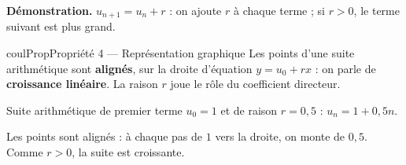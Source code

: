 \documentclass[11pt,a4paper]{article}
\makeatletter
\newcounter{lycee@signet}
\newcommand{\signet}[3][]{\stepcounter{lycee@signet}%
  \edef\lycee@dest{\if\relax\detokenize{#1}\relax
    signet.\arabic{lycee@signet}\else#1\fi}%
  \hypertarget{\lycee@dest}{}\bookmark[level=#2,dest=\lycee@dest]{#3}}
\newenvironment{proprietebox}[1][Propriété]%
  {\begin{boitecours}[phantom={\signet{2}{#1}}]{coulProp}{#1}}{\end{boitecours}}
\newcommand{\demo}[1]{\textbf{\color{coulMeth}Démonstration.} #1}
\makeatother
\begin{document}
\demo{$u_{n+1}=u_{n}+r$ : on ajoute $r$ à chaque terme ; si $r>0$, le terme suivant est
plus grand.}

\begin{proprietebox}[Propriété 4 --- Représentation graphique]
Les points d'une suite arithmétique sont \textbf{alignés}, sur la droite d'équation
$y=u_{0}+rx$ : on parle de \textbf{croissance linéaire}. La raison $r$ joue le rôle du
coefficient directeur.
\end{proprietebox}

\begin{center}
\begin{minipage}{0.5\linewidth}
\centering
{}
\end{minipage}\hfill
\begin{minipage}{0.46\linewidth}
Suite arithmétique de premier terme $u_{0}=1$ et de raison $r=0{,}5$ :
$u_{n}=1+0{,}5n$.

\smallskip
Les points sont alignés : à chaque pas de $1$ vers la droite, on monte de $0{,}5$.
Comme $r>0$, la suite est croissante.
\end{minipage}
\end{center}
\end{document}
